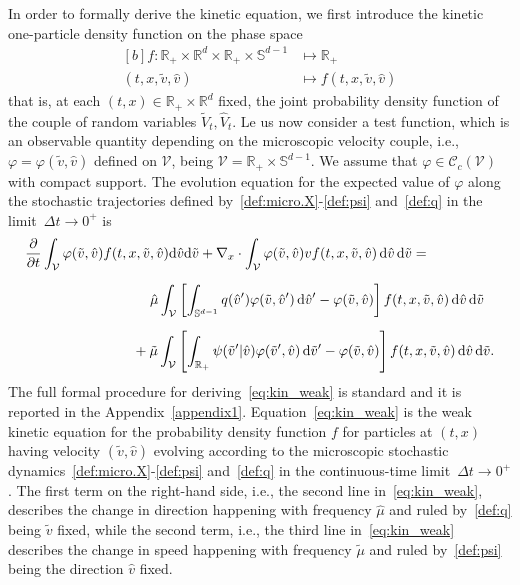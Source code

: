 \documentclass[a4paper]{article}
\theoremstyle{Theorem}\newtheorem{proposition}{Proposition}[section]
\theoremstyle{Remark}\newtheorem{remark}{Remark}[section]
\theoremstyle{Theorem}\newtheorem{theorem}{Theorem}[section]
\newcommand{\R}{\mathbb{R}}
\newcommand{\hv}{\hat{v}}
\newcommand{\tv}{\tilde{v}}
\newcommand{\hV}{\hat{V}}
\newcommand{\tV}{\tilde{V}}
\newcommand{\hmu}{\hat{\mu}}
\newcommand{\tmu}{\tilde{\mu}}
\newcommand{\intS}{\int_{\mathbb{S}^{d-1}}}
\newcommand{\intR}{\int_{\R_+}}
\newcommand{\intV}{\int_{\mathcal{V}}}
\begin{document}
In order to formally derive the kinetic equation, we first introduce the kinetic one-particle density function on the phase space
\begin{equation}\label{def:f}
\begin{aligned}[b]
f: \R_+\times \R^d \times \R_+ \times \mathbb{S}^{d-1} &\longmapsto \R_+ \\[0.3cm]
(t,x, \tv, \hv) &\longmapsto f(t,x, \tv, \hv)
\end{aligned}
\end{equation}
that is, at each $(t,x)\in\R_+\times \R^d$ fixed, the joint probability density function of the couple of random variables $\tV_t, \hV_t$.
Le us now consider a test function, which is an observable quantity depending on the microscopic velocity couple, i.e., $\varphi=\varphi(\tv,\hv)$ defined on $\mathcal{V}$, being $\mathcal{V}= \R_+ \times \mathbb{S}^{d-1}$. We assume that $\varphi \in \mathcal{C}_c(\mathcal{V})$ with compact support. The evolution equation for the expected value of $\varphi$ along the stochastic trajectories defined by~\eqref{def:micro.X}-\eqref{def:psi} and~\eqref{def:q} in the limit~$\Delta t \to 0^+$ %
is
\begin{equation}\label{eq:kin_weak}
\begin{split}
&\dfrac{\partial}{\partial t}\intV\varphi(\tv,\hv) f(t,x,\tv,\hv) {\rm d}\hv {\rm d}\tv+\nabla_x \cdot \intV\varphi(\tv,\hv) v f(t,x,\tv,\hv) \, {\rm d}\hv \, {\rm d}\tv=\\[0.2cm]
&\phantom{\dfrac{\partial}{\partial t}\intV\varphi(\tv,\hv) f(t,x,\tv}\hmu\intV\left[\intS q(\hv')\varphi(\tv,\hv')\, {\rm d}\hv'-\varphi(\tv,\hv)\right]f(t,x,\tv,\hv) \,{\rm d}\hv \, {\rm d}\tv\\[0.2cm]
&\phantom{\dfrac{\partial}{\partial t}\intV\varphi(\tv,\hv) f(t,,}+ \tmu\intV\left[\intR\psi(\tv'|\hv)\varphi(\tv',\hv)\, {\rm d}\tv'-\varphi(\tv,\hv)\right]f(t,x,\tv,\hv) \,{\rm d}\hv \, {\rm d}\tv.
\end{split}
\end{equation}
The full formal procedure for deriving~\eqref{eq:kin_weak} is standard and it is reported in the Appendix~\ref{appendix1}.
Equation~\eqref{eq:kin_weak} is the weak kinetic equation for the probability density function $f$ for particles at $(t,x)$ having velocity $(\tv,\hv)$ evolving according to the microscopic stochastic dynamics~\eqref{def:micro.X}-\eqref{def:psi} and~\eqref{def:q} in the continuous-time limit~$\Delta t \to 0^+$. The first term on the right-hand side, i.e., the second line in~\eqref{eq:kin_weak}, describes the change in direction happening with frequency $\hmu$ and ruled by~\eqref{def:q} being $\tv$ fixed, while the second term, i.e., the third line in~\eqref{eq:kin_weak} describes the change in speed happening with frequency $\tmu$ and ruled by~\eqref{def:psi} being the direction $\hv$ fixed.
\end{document}
